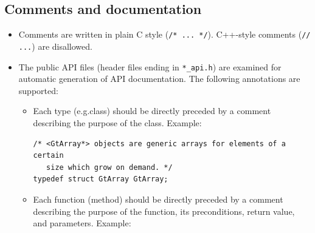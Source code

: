 \documentclass[11pt,final]{article}
\newcommand{\keyword}[1]{\lstinline{#1}}
\begin{document}
\subsection{Comments and documentation}
\label{documentation}
\begin{itemize}
\item
Comments are written in plain C style (\keyword{/* ... */}). C++-style
comments (\keyword{// ...}) are disallowed.
\item
The public API files (header files ending in \keyword{*_api.h}) are examined for
automatic generation of API documentation. The following annotations are
supported:
\begin{itemize}
\item
Each type (e.g.\@ class) should be directly preceded by a comment describing the
purpose of the class. Example:

\begin{lstlisting}
/* <GtArray*> objects are generic arrays for elements of a certain
   size which grow on demand. */
typedef struct GtArray GtArray;
\end{lstlisting}

\item
Each function (method) should be directly preceded by a comment describing the
purpose of the function, its preconditions, return value, and parameters.
Example:


\end{itemize}
\end{itemize}
\end{document}
